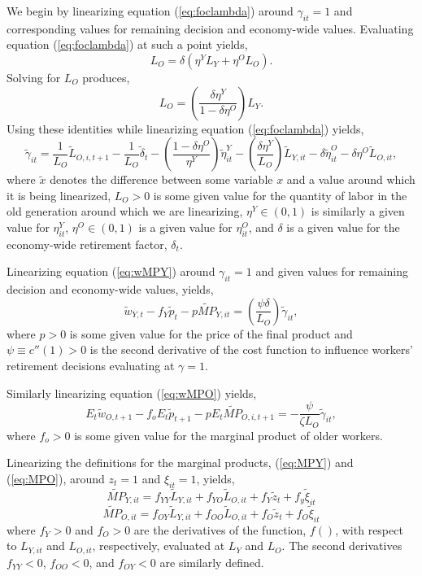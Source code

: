 \documentclass[11pt]{article}
\newcommand{\beq}{\begin{equation}}
\newcommand{\eeq}{\end{equation}}
\begin{document}
We begin by linearizing equation (\ref{eq:foclambda}) around $\gamma_{it}=1$ and corresponding values for remaining decision and economy-wide values. Evaluating equation (\ref{eq:foclambda}) at such a point yields,
\beq L_O = \delta \left( \eta^Y L_Y + \eta^O L_O \right). \eeq
Solving for $L_O$ produces,
\beq L_O = \left(\frac{\delta \eta^Y}{1 - \delta \eta^O} \right) L_Y. \eeq
Using these identities while linearizing equation (\ref{eq:foclambda}) yields,
\beq \label{eq:foclambdalin} \tilde{\gamma}_{it} = \frac{1}{L_O} \tilde{L}_{O,i,t+1} -  \frac{1}{L_O} \tilde{\delta}_t - \left(\frac{1-\delta \eta^O}{\eta^Y}\right) \tilde{\eta}_{it}^Y
  - \left(\frac{\delta \eta^Y}{L_O}\right) \tilde{L}_{Y,it} - \delta \tilde{\eta}_{it}^O - \delta \eta^O \tilde{L}_{O,it}, \eeq
  where $\tilde{x}$ denotes the difference between some variable $x$ and a value around which it is being linearized, $L_O>0$ is some given value for the quantity of labor in the old generation around which we are linearizing, $\eta^Y\in(0,1)$ is similarly a given value for $\eta_{it}^Y$, $\eta^O\in(0,1)$ is a given value for $\eta_{it}^O$, and $\delta$ is a given value for the economy-wide retirement factor, $\delta_{t}$.
  
Linearizing equation (\ref{eq:wMPY}) around $\gamma_{it}=1$ and given values for remaining decision and economy-wide values, yields,
\beq \label{eq:wMPYlin} \tilde{w}_{Y,t} - f_Y \tilde{p}_t - p \tilde{MP}_{Y,it} = \left( \frac{\psi \delta}{L_O} \right) \tilde{\gamma}_{it}, \eeq
where $p>0$ is some given value for the price of the final product and $\psi \equiv c''(1) > 0$ is the second derivative of the cost function to influence workers' retirement decisions evaluating at $\gamma=1$.

Similarly linearizing equation (\ref{eq:wMPO}) yields,
\beq \label{eq:wMPOlin} E_t \tilde{w}_{O,t+1} - f_o E_t \tilde{p}_{t+1} - p E_t \tilde{MP}_{O,i,t+1} = - \frac{\psi}{\zeta L_O} \tilde{\gamma}_{it}, \eeq
where $f_o>0$ is some given value for the marginal product of older workers.


Linearizing the definitions for the marginal products, (\ref{eq:MPY}) and (\ref{eq:MPO}), around $z_t=1$ and $\xi_{it}=1$, yields,
\beq \label{eq:mpylin} \tilde{MP}_{Y,it} = f_{YY} \tilde{L}_{Y,it} + f_{YO} \tilde{L}_{O,it} + f_Y \tilde{z}_t + f_y \tilde{\xi}_{it} \eeq
\beq \label{eq:mpolin-temp} \tilde{MP}_{O,it} = f_{OY} \tilde{L}_{Y,it} + f_{OO} \tilde{L}_{O,it} + f_O \tilde{z}_t + f_O \tilde{\xi}_{it} \eeq
where $f_Y>0$ and $f_O>0$ are the derivatives of the function, $f()$, with respect to $L_{Y,it}$ and $L_{O,it}$, respectively, evaluated at $L_Y$ and $L_O$. The second derivatives $f_{YY}<0$, $f_{OO}<0$, and $f_{OY}<0$ are similarly defined.
\end{document}
